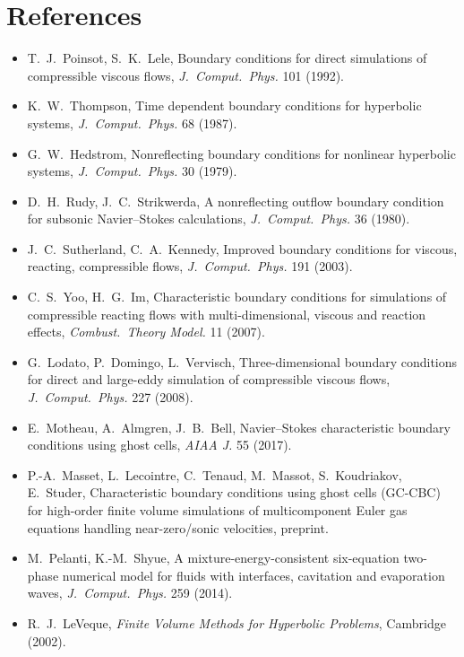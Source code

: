 \documentclass[11pt,a4paper]{article}
\begin{document}
\section*{References}
\begin{itemize}
\item T.~J.~Poinsot, S.~K.~Lele, Boundary conditions for direct simulations of compressible viscous flows, \emph{J.\ Comput.\ Phys.} 101 (1992).
\item K.~W.~Thompson, Time dependent boundary conditions for hyperbolic systems, \emph{J.\ Comput.\ Phys.} 68 (1987).
\item G.~W.~Hedstrom, Nonreflecting boundary conditions for nonlinear hyperbolic systems, \emph{J.\ Comput.\ Phys.} 30 (1979).
\item D.~H.~Rudy, J.~C.~Strikwerda, A nonreflecting outflow boundary condition for subsonic Navier--Stokes calculations, \emph{J.\ Comput.\ Phys.} 36 (1980).
\item J.~C.~Sutherland, C.~A.~Kennedy, Improved boundary conditions for viscous, reacting, compressible flows, \emph{J.\ Comput.\ Phys.} 191 (2003).
\item C.~S.~Yoo, H.~G.~Im, Characteristic boundary conditions for simulations of compressible reacting flows with multi-dimensional, viscous and reaction effects, \emph{Combust.\ Theory Model.} 11 (2007).
\item G.~Lodato, P.~Domingo, L.~Vervisch, Three-dimensional boundary conditions for direct and large-eddy simulation of compressible viscous flows, \emph{J.\ Comput.\ Phys.} 227 (2008).
\item E.~Motheau, A.~Almgren, J.~B.~Bell, Navier--Stokes characteristic boundary conditions using ghost cells, \emph{AIAA J.} 55 (2017).
\item P.-A.~Masset, L.~Lecointre, C.~Tenaud, M.~Massot, S.~Koudriakov, E.~Studer, Characteristic boundary conditions using ghost cells (GC-CBC) for high-order finite volume simulations of multicomponent Euler gas equations handling near-zero/sonic velocities, preprint.
\item M.~Pelanti, K.-M.~Shyue, A mixture-energy-consistent six-equation two-phase numerical model for fluids with interfaces, cavitation and evaporation waves, \emph{J.\ Comput.\ Phys.} 259 (2014).
\item R.~J.~LeVeque, \emph{Finite Volume Methods for Hyperbolic Problems}, Cambridge (2002).
\end{itemize}
\end{document}
